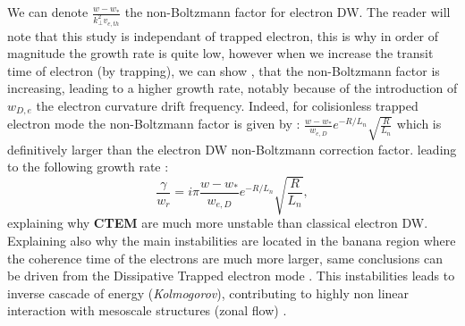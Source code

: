 \documentclass[11pt,a4paper,openany]{report}
\begin{document}
\begin{multicols}{2}
    We can denote $\frac{w-w_*}{k_\perp^2v_{e,th}}$ the non-Boltzmann factor for electron DW. The reader will note that this study is independant of trapped electron, this is why in order of magnitude the growth rate is quite low, however when we increase the transit time of electron (by trapping),
    we can show \cite{Sazn_diego}, that the non-Boltzmann factor is increasing, leading to a higher growth rate, notably because of the introduction of $w_{D,e}$ the electron curvature drift frequency. Indeed, for colisionless trapped electron mode the non-Boltzmann factor is given by : $\frac{w - w_*}{w_{e,D}}e^{-R/L_n}\sqrt{\frac{R}{L_n}}$ which is definitively larger than the electron DW non-Boltzmann correction factor.
    leading to the following growth rate : $$\frac{\gamma}{w_r} = i \pi \frac{w - w_*}{w_{e,D}}e^{-R/L_n}\sqrt{\frac{R}{L_n}},$$ explaining why \textbf{CTEM} are much more unstable than classical electron DW. Explaining also why the main instabilities are located in the banana region where the coherence time of the electrons are much more larger, same conclusions can be driven from the Dissipative Trapped electron mode \cite{Trapped_Particle_Mode}. This instabilities leads to inverse cascade of energy (\emph{Kolmogorov}), contributing to highly non linear interaction with mesoscale structures (zonal flow) \cite{San_diego,Krutkin_thesis,DW_transport}.
\end{multicols}
\end{document}
